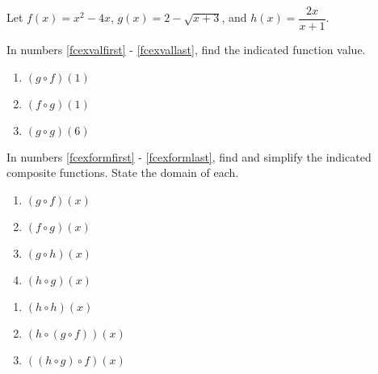 \begin{ex}  Let $f(x) = x^2-4x$, $g(x) = 2-\sqrt{x+3}$, and $h(x) = \dfrac{2x}{x+1}$.  

In numbers \ref{fcexvalfirst} - \ref{fcexvallast}, find the indicated function value.

\begin{multicols}{3}
\begin{enumerate}

\item  $(g \circ f)(1)$ \label{fcexvalfirst}

\item  $(f \circ g)(1)$

\item  $(g \circ g)(6)$ \label{fcexvallast}

\setcounter{HW}{\value{enumi}}
\end{enumerate}
\end{multicols}





In numbers \ref{fcexformfirst} - \ref{fcexformlast}, find and simplify the indicated composite functions.  State the domain of each.

\begin{multicols}{4}
\begin{enumerate}
\setcounter{enumi}{\value{HW}}

\item  $(g \circ f)(x)$ \label{fcexformfirst}

\item  $(f \circ g)(x)$

\item  $(g \circ h)(x)$

\item  $(h \circ g)(x)$

\setcounter{HW}{\value{enumi}}
\end{enumerate}
\end{multicols}

\begin{multicols}{4}
\begin{enumerate}
\setcounter{enumi}{\value{HW}}

\item  $(h \circ h)(x)$

\item  $(h \circ (g \circ f))(x)$ 

\item  $((h \circ g) \circ f)(x)$ \label{fcexformlast}


\end{enumerate}
\end{multicols}
\end{ex}
